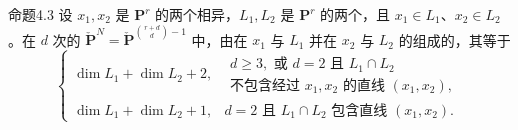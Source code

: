 \begin{SGAresult}{命题}{4.3}
设 $x_1,x_2$ 是 $\mathbf P^r$ 的两个相异，$L_1,L_2$ 是 $\mathbf P^r$ 的两个，且 $x_1\in L_1$、$x_2\in L_2$。在 $d$ 次的
$\check{\mathbf P}^{N}=\check{\mathbf P}^{\binom{r+d}{d}-1}$ 中，由在 $x_1$ 与 $L_1$ 并在 $x_2$ 与 $L_2$ 的组成的，其等于
\[
\begin{cases}
\dim L_1+\dim L_2+2,&
\begin{array}{l}d\geq3,\text{ 或 }d=2\text{ 且 }L_1\cap L_2\\
\text{不包含经过 }x_1,x_2\text{ 的直线 }(x_1,x_2),\end{array}\\[2pt]
\dim L_1+\dim L_2+1,&d=2\text{ 且 }L_1\cap L_2\text{ 包含直线 }(x_1,x_2).
\end{cases}
\]
\end{SGAresult}
